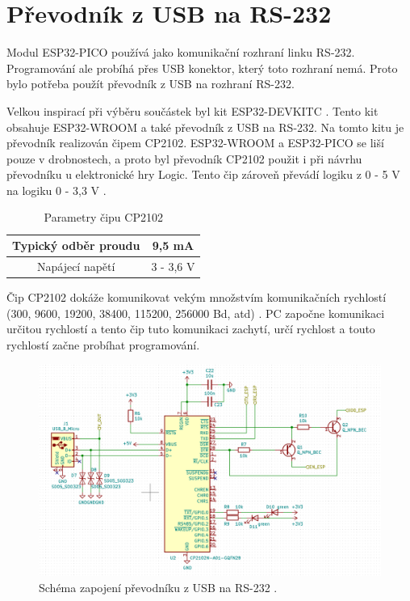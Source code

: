   \section{Převodník z USB na RS-232}
  Modul ESP32-PICO používá jako komunikační rozhraní linku RS-232. Programování ale probíhá přes USB konektor, který toto rozhraní
  nemá. Proto bylo potřeba použít převodník z USB na rozhraní RS-232.
  
  Velkou inspirací při výběru součástek byl kit ESP32-DEVKITC \cite{Devkit_schema}. Tento kit obsahuje ESP32-WROOM a také převodník z 
  USB na RS-232. Na tomto kitu je převodník realizován čipem CP2102. ESP32-WROOM a ESP32-PICO se liší pouze v drobnostech, 
  a proto byl převodník CP2102 použit i při návrhu převodníku u elektronické hry Logic.  Tento čip zároveň převádí logiku 
  z 0 - 5 V na logiku 0 - 3,3 V \cite{CP2102_datasheet}. 

  \begin{table}[!h]
    \caption{Parametry čipu CP2102 \cite{CP2102_datasheet}}
    \begin{center}
        \begin{tabular}{|c|c|}
            \hline
            Typický odběr proudu   & 9,5 mA \\ 
            \hline
            Napájecí napětí        & 3 - 3,6 V \\
            \hline
        \end{tabular}    
    \end{center}
  \end{table}

  Čip CP2102 dokáže komunikovat vekým množstvím komunikačních rychlostí (300, 9600, 19200, 38400, 115200, 256000 Bd, atd) 
  \cite{CP2102_datasheet}. PC započne komunikaci určitou rychlostí a tento čip tuto komunikaci zachytí, určí rychlost 
  a touto rychlostí začne probíhat programování.

  \begin{figure}[!h]
      \begin{center}
        \includegraphics[scale=0.6]{obrazky/CP2102_schema.png}
      \end{center}
      \caption[Schéma zapojení převodníku z USB na RS-232]{Schéma zapojení převodníku z USB na RS-232 \cite{Devkit_schema}.}
  \end{figure}

